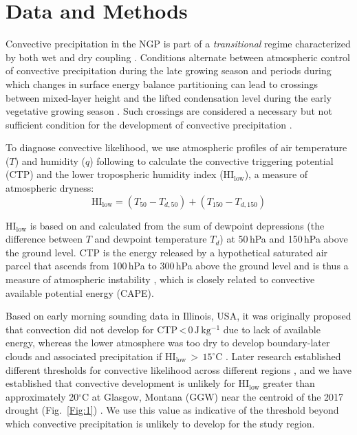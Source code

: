 \documentclass[hess, manuscript]{copernicus}
\begin{document}
\section{Data and Methods}
Convective precipitation in the NGP is part of a \emph{transitional} regime characterized by both wet and dry coupling \citep{Findell_2003b}. Conditions alternate between atmospheric control of convective precipitation during the late growing season and periods during which changes in surface energy balance partitioning can lead to crossings between mixed-layer height and the lifted condensation level during the early vegetative growing season \citep{Gerken_2018}. Such crossings are considered a necessary but not sufficient condition for the development of convective precipitation \citep{Juang_2007a, Juang_2007b}.

To diagnose convective likelihood, we use atmospheric profiles of air temperature ($T$) and humidity ($q$) following \citep{Findell_2003a, Findell_2003b} to calculate the convective triggering potential (CTP) and the lower tropospheric humidity index ($\mathrm{HI_{low}}$), a measure of atmospheric dryness:
%
\begin{equation}
\mathrm{HI_{low}} = \left( T_{50} - T_{d,50} \right) + \left( T_{150} - T_{d,150} \right)
\end{equation}

$\mathrm{HI_{low}}$ is based on \citet{Lytinska_1976} and calculated from the sum of dewpoint depressions (the difference between $T$ and dewpoint temperature $T_d$) at 50\,hPa and 150\,hPa above the ground level. CTP is the energy released by a hypothetical saturated air parcel that ascends from 100\,hPa to 300\,hPa above the ground level and is thus a measure of atmospheric instability \citep{Findell_2003a, Findell_2003b}, which is closely related to convective available potential energy (CAPE). 

Based on early morning sounding data in Illinois, USA, it was originally proposed that convection did not develop for CTP\,<\,0\,$\mathrm{J\,kg^{-1}}$ due to lack of available energy, whereas the lower atmosphere was too dry to develop boundary-later clouds and associated precipitation if $\mathrm{HI_{low}\,>\,15^\circ C}$ \citep{Findell_2003a, Findell_2003b}. Later research established different thresholds for convective likelihood across different regions \citep{Ferguson_2011, Roundy_2012}, and we have established that convective development is unlikely for $\mathrm{HI_{low}}$  greater than approximately 20$\mathrm{^\circ}$C at Glasgow, Montana (GGW) near the centroid of the 2017 drought (Fig.~\ref{Fig:1}) \citep{Gerken_2018}. We use this value as indicative of the threshold beyond which convective precipitation is unlikely to develop for the study region.
\end{document}
